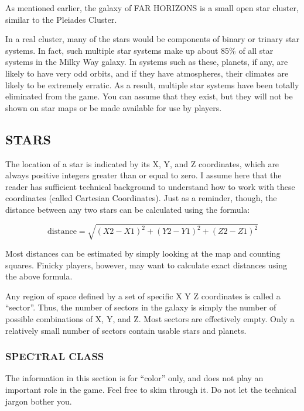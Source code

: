 \documentclass[10pt,titlepage]{article}
\begin{document}
As mentioned earlier, the galaxy of FAR HORIZONS is a small open star cluster,
similar to the Pleiades Cluster.

In a real cluster, many of the stars would be components of binary or trinary
star systems.  In fact, such multiple star systems make up about 85\% of all
star systems in the Milky Way galaxy.  In systems such as these, planets, if
any, are likely to have very odd orbits, and if they have atmospheres, their
climates are likely to be extremely erratic.  As a result, multiple star
systems have been totally eliminated from the game.  You can assume that they
exist, but they will not be shown on star maps or be made available for use
by players.


\subsection{STARS}

The location of a star is indicated by its X, Y, and Z coordinates, which are
always positive integers greater than or equal to zero.  I assume here that the
reader has sufficient technical background to understand how to work with these
coordinates (called Cartesian Coordinates).  Just as a reminder, though, the
distance between any two stars can be calculated using the formula:

\begin{equation*}
      \textrm{distance}  =  \sqrt{ (X2 - X1)^2   +  (Y2 - Y1)^2   +  (Z2 - Z1)^2 }
\end{equation*}

Most distances can be estimated by simply looking at the map and counting
squares.  Finicky players, however, may want to calculate exact distances using
the above formula.

Any region of space defined by a set of specific X Y Z coordinates is called a
``sector''.  Thus, the number of sectors in the galaxy is simply the number of
possible combinations of X, Y, and Z.  Most sectors are effectively empty.
Only a relatively small number of sectors contain usable stars and planets.


\subsubsection{SPECTRAL CLASS}

The information in this section is for ``color'' only, and does not play an
important role in the game.  Feel free to skim through it.  Do not let the
technical jargon bother you.
\end{document}
